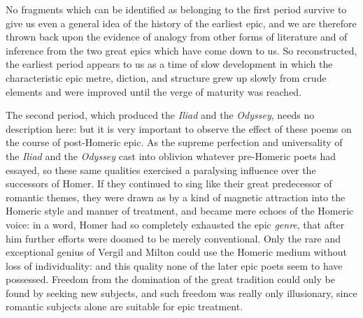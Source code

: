 No fragments which can be identified as belonging to the first period survive
to give us even a general idea of the history of the earliest epic, and we are
therefore thrown back upon the evidence of analogy from other forms of
literature and of inference from the two great epics which have come down to
us. So reconstructed, the earliest period appears to us as a time of slow
development in which the characteristic epic metre, diction, and structure grew
up slowly from crude elements and were improved until the verge of maturity was
reached.

The second period, which produced the \emph{Iliad} and the \emph{Odyssey},
needs no description here: but it is very important to observe the effect of
these poems on the course of post-Homeric epic. As the supreme perfection and
universality of the \emph{Iliad} and the \emph{Odyssey} cast into oblivion
whatever pre-Homeric poets had essayed, so these same qualities exercised a
paralysing influence over the successors of Homer. If they continued to sing
like their great predecessor of romantic themes, they were drawn as by a kind
of magnetic attraction into the Homeric style and manner of treatment, and
became mere echoes of the Homeric voice: in a word, Homer had so completely
exhausted the epic \emph{genre}, that after him further efforts were doomed to
be merely conventional. Only the rare and exceptional genius of Vergil and
Milton could use the Homeric medium without loss of individuality: and this
quality none of the later epic poets seem to have possessed. Freedom from the
domination of the great tradition could only be found by seeking new subjects,
and such freedom was really only illusionary, since romantic subjects alone are
suitable for epic treatment.

